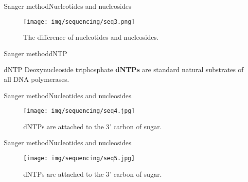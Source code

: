 \documentclass[10pt]{beamer}
\newcommand{\1}{
	\setbeamertemplate{background}{
		\texttt{[image: img/1]}
		\tikz[overlay] \fill[fill opacity=0.75,fill=white] (0,0) rectangle (-\paperwidth,\paperheight);
	}
}
\begin{document}
\begin{frame}{Sanger method}{Nucleotides and nucleosides}
	\begin{figure}[]
		\centering
		\texttt{[image: img/sequencing/seq3.png]}
		\label{img:mot2}
		\caption{The difference of nucleotides and nucleosides.}
	\end{figure}
\end{frame}


\begin{frame}{Sanger method}{dNTP}	
	\begin{block}{dNTP}
		Deoxynucleoside triphosphate \textbf{dNTPs} are standard natural substrates of all DNA polymerases.
	\end{block}
\end{frame}

\begin{frame}{Sanger method}{Nucleotides and nucleosides}
	\begin{figure}[]
		\centering
		\texttt{[image: img/sequencing/seq4.jpg]}
		\label{img:mot2}
		\caption{dNTPs are attached to the 3' carbon of sugar.}
	\end{figure}
\end{frame}

\begin{frame}{Sanger method}{Nucleotides and nucleosides}
	\begin{figure}[]
		\centering
		\texttt{[image: img/sequencing/seq5.jpg]}
		\label{img:mot2}
		\caption{dNTPs are attached to the 3' carbon of sugar.}
	\end{figure}
\end{frame}
\end{document}
